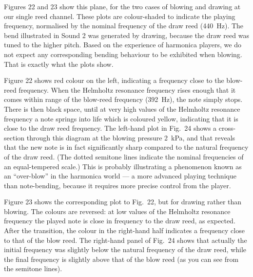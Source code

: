   Figures 22 and 23 show this plane, for the two cases of blowing and drawing 
  at our single reed channel. These plots are colour-shaded to indicate the 
  playing frequency, normalised by the nominal frequency of the draw reed 
  (440~Hz). The bend illustrated in Sound 2 was generated by drawing, because 
  the draw reed was tuned to the higher pitch. Based on the experience of 
  harmonica players, we do not expect any corresponding bending behaviour to be 
  exhibited when blowing. That is exactly what the plots show. 



  Figure 22 shows red colour on the left, indicating a frequency close to the 
  blow-reed frequency. When the Helmholtz resonance frequency rises enough that 
  it comes within range of the blow-reed frequency (392~Hz), the note simply 
  stops. There is then black space, until at very high values of the Helmholtz 
  resonance frequency a note springs into life which is coloured yellow, 
  indicating that it is close to the draw reed frequency. The left-hand plot in 
  Fig.\ 24 shows a cross-section through this diagram at the blowing pressure 
  2~kPa, and that reveals that the new note is in fact significantly sharp 
  compared to the natural frequency of the draw reed. (The dotted semitone 
  lines indicate the nominal frequencies of an equal-tempered scale.) This is 
  probably illustrating a phenomenon known as an “over-blow” in the harmonica 
  world — a more advanced playing technique than note-bending, because it 
  requires more precise control from the player. 

  Figure 23 shows the corresponding plot to Fig.\ 22, but for drawing rather 
  than blowing. The colours are reversed: at low values of the Helmholtz 
  resonance frequency the played note is close in frequency to the draw reed, 
  as expected. After the transition, the colour in the right-hand half 
  indicates a frequency close to that of the blow reed. The right-hand panel of 
  Fig.\ 24 shows that actually the initial frequency was slightly below the 
  natural frequency of the draw reed, while the final frequency is slightly 
  above that of the blow reed (as you can see from the semitone lines). 

